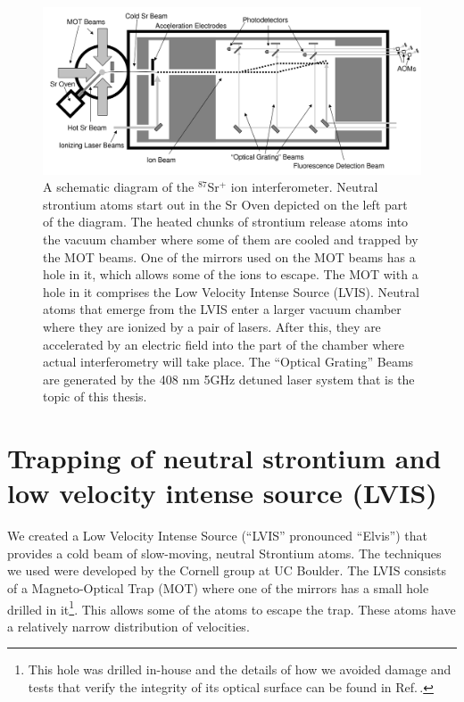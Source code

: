 \begin{figure}
\centerline{
\includegraphics[totalheight=0.3\textheight]{interferometer_diagram}
}
\caption[Ion interferometer]{\label{fig:IonInterferometer}
A schematic diagram of the $^{87}$Sr$^+$ ion interferometer. Neutral strontium atoms start out in the Sr Oven depicted on the left part of the diagram. The heated chunks of strontium release atoms into the vacuum chamber where some of them are cooled and trapped by the MOT beams. One of the mirrors used on the MOT beams has a hole in it, which allows some of the ions to escape. The MOT with a hole in it comprises the Low Velocity Intense Source (LVIS). Neutral atoms that emerge from the LVIS enter a larger vacuum chamber where they are ionized by a pair of lasers. After this, they are accelerated by an electric field into the part of the chamber where actual interferometry will take place. The ``Optical Grating'' Beams are generated by the 408 nm 5GHz detuned laser system that is the topic of this thesis.} 
\end{figure}

\section{Trapping of neutral strontium and low velocity intense source (LVIS)}

We created a Low Velocity Intense Source (``LVIS'' pronounced ``Elvis'') \cite{cjeDiss} that provides a cold beam of slow-moving, neutral Strontium atoms. The techniques we used were developed by the Cornell group at UC Boulder\cite{LVIS}. The LVIS consists of a Magneto-Optical Trap (MOT) where one of the mirrors has a small hole drilled in it\footnote{This hole was drilled in-house and the details of how we avoided damage and tests that verify the integrity of its optical surface can be found in Ref.\,\cite{cjeDiss}.}. This allows some of the atoms to escape the trap. These atoms have a relatively narrow distribution of velocities. %

